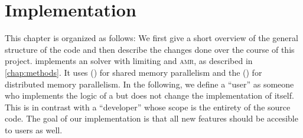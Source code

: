 \chapter{Implementation}\label{chap:implementation}
This chapter is organized as follows:
We first give a short overview of the general structure of the \exahype{} code and then describe the changes done over the course of this project.
\exahype{} implements an \aderdg{} solver with \muscl{} limiting and \textsc{amr}, as described in \cref{chap:methods}.
It uses  (\tbb{}) for shared memory parallelism and the  (\mpi{}) for distributed memory parallelism. 
In the following, we define a \enquote{user} as someone who implements the logic of a \pde{} but does not change the implementation of \exahype{} itself.
This is in contrast with a \enquote{developer} whose scope is the entirety of the source code.
The goal of our implementation is that all new features should be accesible to users as well.

